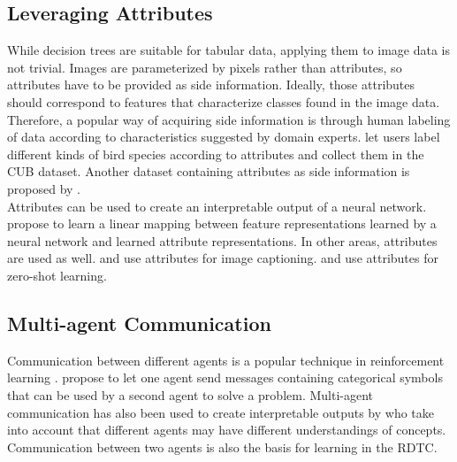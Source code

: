 \documentclass[a4paper,cleardoubleempty,BCOR1cm, 11pt]{report}
\begin{document}
\subsection{Leveraging Attributes}
While decision trees are suitable for tabular data, applying them to image data is not trivial. Images are parameterized by pixels rather than attributes, so attributes have to be provided as side information. Ideally, those attributes should correspond to features that characterize classes found in the image data. Therefore, a popular way of acquiring side information is through human labeling of data according to characteristics suggested by domain experts. \citet{WahCUB_200_2011} let users label different kinds of bird species according to attributes and collect them in the CUB dataset. Another dataset containing attributes as side information is proposed by \citet{8413121}.\\
Attributes can be used to create an interpretable output of a neural network. \citet{akata2013label} propose to learn a linear mapping between feature representations learned by a neural network and learned attribute representations.
In other areas, attributes are used as well. \citet{kulkarni2013babytalk} and \citet{ordonez2011im2text} use attributes for image captioning. \citet{lampert2009learning} and \citet{palatucci2009zero} use attributes for zero-shot learning.


\subsection{Multi-agent Communication}
Communication between different agents is a popular technique in reinforcement learning \cite{havrylov2017emergence, lazaridou2018emergence, cao2018emergent, jiang2018learning, das2019tarmac}. \citet{foerster2016learning} propose to let one agent send messages containing categorical symbols that can be used by a second agent to solve a problem. Multi-agent communication has also been used to create interpretable outputs by \citet{rodriguez2019modeling} who take into account that different agents may have different understandings of concepts. Communication between two agents is also the basis for learning in the RDTC.
\end{document}
